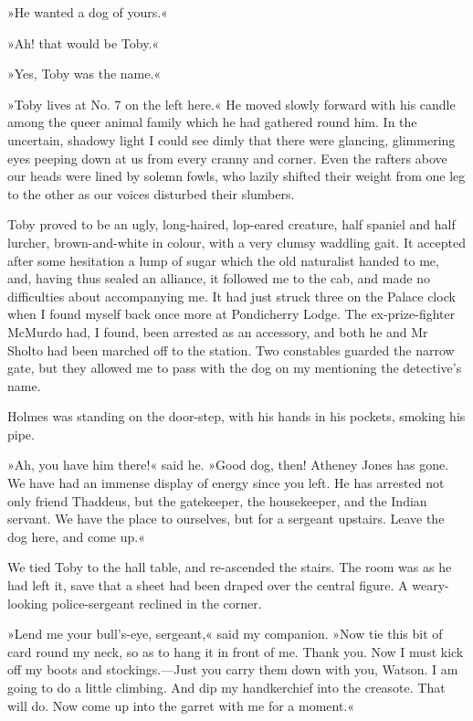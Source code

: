 »He wanted a dog of yours.«

»Ah! that would be Toby.«

»Yes, Toby was the name.«

»Toby lives at No. 7 on the left here.« He moved slowly forward with his candle among the queer animal family which he had gathered round him. In the uncertain, shadowy light I could see dimly that there were glancing, glimmering eyes peeping down at us from every cranny and corner. Even the rafters above our heads were lined by solemn fowls, who lazily shifted their weight from one leg to the other as our voices disturbed their slumbers.

Toby proved to be an ugly, long-haired, lop-eared creature, half spaniel and half lurcher, brown-and-white in colour, with a very clumsy waddling gait. It accepted after some hesitation a lump of sugar which the old naturalist handed to me, and, having thus sealed an alliance, it followed me to the cab, and made no difficulties about accompanying me. It had just struck three on the Palace clock when I found myself back once more at Pondicherry Lodge. The ex-prize-fighter McMurdo had, I found, been arrested as an accessory, and both he and Mr Sholto had been marched off to the station. Two constables guarded the narrow gate, but they allowed me to pass with the dog on my mentioning the detective's name.

Holmes was standing on the door-step, with his hands in his pockets, smoking his pipe.

»Ah, you have him there!« said he. »Good dog, then! Atheney Jones has gone. We have had an immense display of energy since you left. He has arrested not only friend Thaddeus, but the gatekeeper, the housekeeper, and the Indian servant. We have the place to ourselves, but for a sergeant upstairs. Leave the dog here, and come up.«

We tied Toby to the hall table, and re-ascended the stairs. The room was as he had left it, save that a sheet had been draped over the central figure. A weary-looking police-sergeant reclined in the corner.

»Lend me your bull's-eye, sergeant,« said my companion. »Now tie this bit of card round my neck, so as to hang it in front of me. Thank you. Now I must kick off my boots and stockings.—Just you carry them down with you, Watson. I am going to do a little climbing. And dip my handkerchief into the creasote. That will do. Now come up into the garret with me for a moment.«

